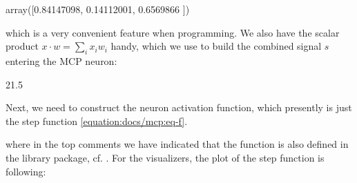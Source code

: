 \documentclass[letterpaper,10pt,english]{jupyterBook}
\begin{document}
\begin{sphinxVerbatim}[commandchars=\\\{\}]
array([0.84147098, 0.14112001, 0.6569866 ])
\end{sphinxVerbatim}

\sphinxAtStartPar
which is a very convenient feature when programming. We also have the scalar product \(x \cdot w = \sum_i x_i w_i\) handy, which we use to build the combined signal \(s\) entering the MCP neuron:

\begin{sphinxVerbatim}[commandchars=\\\{\}]
\end{sphinxVerbatim}

\begin{sphinxVerbatim}[commandchars=\\\{\}]
21.5
\end{sphinxVerbatim}

\sphinxAtStartPar
Next, we need to construct the neuron activation function, which presently is just the step function \eqref{equation:docs/mcp:eq-f}.

\begin{sphinxVerbatim}[commandchars=\\\{\}]
        
             
         
              
         
\end{sphinxVerbatim}

\sphinxAtStartPar
where in the top comments we have indicated that the function is also defined in the  library package, cf. {\hyperref[\detokenize{docs/appendix:app-lab}]{}}. For the visualizers, the plot of the step function is following:
\end{document}
